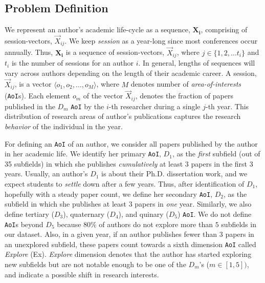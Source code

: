 \subsection{Problem Definition}
We represent an author's academic life-cycle as a sequence, $\mathbf{X_i}$, comprising of session-vectors, $\vec{X}_{ij}$. We keep \emph{session} as a year-long since most conferences occur annually. Thus, $\mathbf{X_i}$ is a sequence of session-vectors, $\vec{X}_{ij}$, where $j \in \{1, 2, \ldots t_i\}$ and $t_i$ is the number of sessions for an author $i$. In general, lengths of sequences will vary across authors depending on the length of their academic career.
A session, $\vec{X}_{ij}$, is a vector $\langle o_1, o_2, \ldots, o_M \rangle$, where $M$ denotes number of \emph{area-of-interests} (\texttt{AoI}s). Each element $o_m$ of the vector $\vec{X}_{ij}$, denotes the fraction of papers published in the $D_m$ \texttt{AoI} by the $i$-th researcher during a single $j$-th year. This distribution of research areas of author's publications captures the research \emph{behavior} of the individual in the year.

For defining an \texttt{AoI} of an author, we consider all papers published by the author in her academic life. We identify her primary \texttt{AoI}, $D_1$, as the \emph{first} subfield (out of 35 subfields) in which she publishes \emph{cumulatively} at least $3$ papers in the first 3 years. Usually, an author's $D_1$ is about their Ph.D. dissertation work, and we expect students to \emph{settle} down after a few years. Thus, after identification of $D_1$, hopefully with a steady paper count, we define her secondary \texttt{AoI}, $D_2$, as the subfield in which she publishes at least $3$ papers in \emph{one} year. Similarly, we also define tertiary ($D_3$), quaternary ($D_4$), and quinary ($D_5$) \texttt{AoI}. We do not define \texttt{AoI}s beyond $D_5$ because 80\% of authors do not explore more than $5$ subfields in our dataset. Also, in a given year, if an author publishes fewer than $3$ papers in an unexplored subfield, these papers count towards a sixth dimension \texttt{AoI} called \emph{Explore} (Ex).  \emph{Explore} dimension denotes that the author has started exploring new subfields but are not notable enough to be one of the $D_m$'s ($m \in {[1,5]})$, and indicate a possible shift in research interests.

